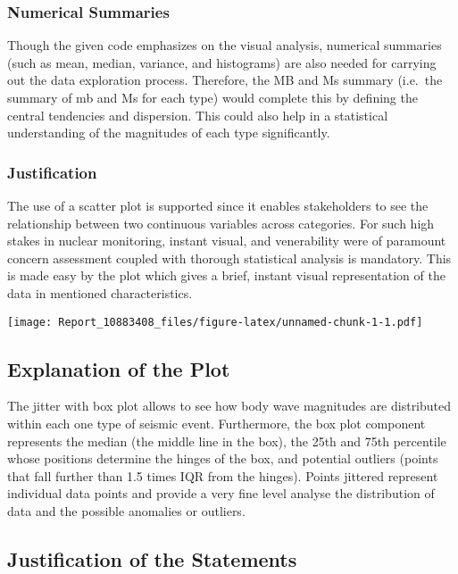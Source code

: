 \documentclass[
]{article}
\begin{document}
\subsubsection{Numerical Summaries}\label{numerical-summaries}

Though the given code emphasizes on the visual analysis, numerical
summaries (such as mean, median, variance, and histograms) are also
needed for carrying out the data exploration process. Therefore, the MB
and Ms summary (i.e.~the summary of mb and Ms for each type) would
complete this by defining the central tendencies and dispersion. This
could also help in a statistical understanding of the magnitudes of each
type significantly.

\subsubsection{Justification}\label{justification}

The use of a scatter plot is supported since it enables stakeholders to
see the relationship between two continuous variables across categories.
For such high stakes in nuclear monitoring, instant visual, and
venerability were of paramount concern assessment coupled with thorough
statistical analysis is mandatory. This is made easy by the plot which
gives a brief, instant visual representation of the data in mentioned
characteristics.

\texttt{[image: Report\_10883408\_files/figure-latex/unnamed-chunk-1-1.pdf]}

\subsection{Explanation of the Plot}\label{explanation-of-the-plot}

The jitter with box plot allows to see how body wave magnitudes are
distributed within each one type of seismic event. Furthermore, the box
plot component represents the median (the middle line in the box), the
25th and 75th percentile whose positions determine the hinges of the
box, and potential outliers (points that fall further than 1.5 times IQR
from the hinges). Points jittered represent individual data points and
provide a very fine level analyse the distribution of data and the
possible anomalies or outliers.

\subsection{Justification of the
Statements}\label{justification-of-the-statements}
\end{document}
